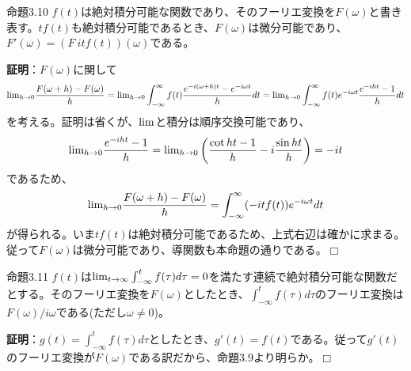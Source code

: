 \documentclass[dvipdfmx, 9pt, a4paper]{jsarticle}
\def\qed{\hfill $\Box$}
\begin{document}
\begin{itembox}[l]{命題3.10}
$f(t)$は絶対積分可能な関数であり、そのフーリエ変換を$F(\omega)$と書き表す。$tf(t)$も絶対積分可能であるとき、$F(\omega)$は微分可能であり、$F'(\omega)=(F~itf(t))(\omega)$である。
\end{itembox}
{\bf 証明}：$F(\omega)$に関して
\begin{equation}
{\lim}_{h \to 0}\frac{F(\omega+h)-F(\omega)}{h}={\rm lim}_{h \to 0}\int_{-\infty}^\infty f(t)\frac{e^{-i(\omega+h)t}-e^{-i\omega t}}{h}dt={\rm lim}_{h \to 0}\int_{-\infty}^\infty f(t)e^{-i\omega t}\frac{e^{-iht}-1}{h}dt \notag
\end{equation}
を考える。証明は省くが、${\rm lim}$と積分は順序交換可能であり、
\begin{equation}
{\rm lim}_{h \to 0}\frac{e^{-iht}-1}{h}={\rm lim}_{h \to 0}\left( \frac{\cot ht-1}{h}-i\frac{\sin ht}{h} \right)=-it \notag
\end{equation}
であるため、
\begin{equation}
{\lim}_{h \to 0}\frac{F(\omega+h)-F(\omega)}{h}=\int_{-\infty}^\infty (-itf(t))e^{-i\omega t}dt \notag
\end{equation}
が得られる。いま$tf(t)$は絶対積分可能であるため、上式右辺は確かに求まる。従って$F(\omega)$は微分可能であり、導関数も本命題の通りである。\qed

\begin{itembox}[l]{命題3.11}
$f(t)$は${\rm lim}_{t \to \infty}\int_{-\infty}^tf(\tau)d\tau=0$を満たす連続で絶対積分可能な関数だとする。そのフーリエ変換を$F(\omega)$としたとき、$\int_{-\infty}^tf(\tau)d\tau$のフーリエ変換は$F(\omega)/i\omega$である(ただし$\omega \neq 0$)。
\end{itembox}
{\bf 証明}：$g(t)=\int_{-\infty}^tf(\tau)d\tau$としたとき、$g'(t)=f(t)$である。従って$g'(t)$のフーリエ変換が$F(\omega)$である訳だから、命題3.9より明らか。\qed
\end{document}
